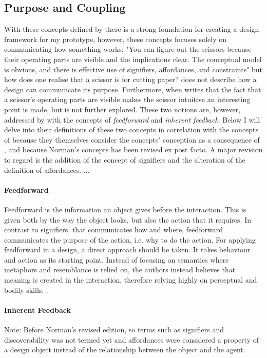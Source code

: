 \subsection{Purpose and Coupling}
With these concepts defined by  there is a strong foundation for creating a design framework for my prototype, however, these concepts focuses solely on communicating how something works: "You can figure out the scissors because their operating parts are visible and the implications clear. The conceptual model is obvious, and there is effective use of signifiers, affordances, and constraints" \cite[p. 27]{norman} but how does one realise that a scissor is for cutting paper?  does not describe how a design can communicate its purpose. Furthermore, when  writes that the fact that a scissor's operating parts are visible makes the scissor intuitive an interesting point is made, but is not further explored. These two notions are, however, addressed by  with the concepts of \textit{feedforward} and \textit{inherent feedback}. Below I will delve into their definitions of these two concepts in correlation with the concepts of  because they themselves consider the concepts' conception as a consequence of , and because Norman's concepts has been revised \cite{norman} ex post facto. A major revision to regard is the addition of the concept of signifiers and the alteration of the definition of affordances. ...

\paragraph{Feedforward} Feedforward is the information an object gives before the interaction. This is given both by the way the object looks, but also the action that it requires. In contrast to signifiers, that communicates how and where, feedforward communicates the purpose of the action, i.e. why to do the action. For applying feedforward in a design, a direct approach should be taken. It takes behaviour and action as its starting point. Instead of focusing on semantics where metaphors and resemblance is relied on, the authors instead believes that meaning is created in the interaction, therefore relying highly on perceptual and bodily skills. \cite{howdonald}.

\paragraph{Inherent Feedback} Note: Before Norman's revised edition, so terms such as signifiers and discoverability was not termed yet and affordances were considered a property of a design object instead of the relationship between the object and the agent.

